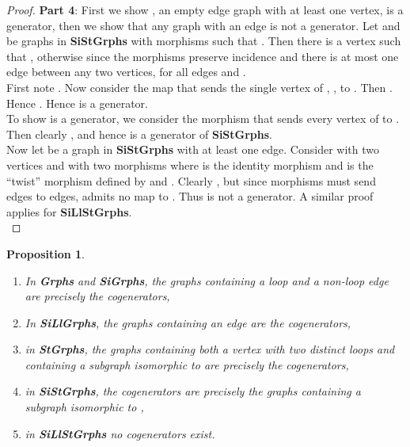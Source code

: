 \documentclass[11pt]{article}
\newtheorem{proposition}[theorem]{Proposition}
\begin{document}
\begin{proof}
\indent \textbf{Part 4}: First we show , an empty edge graph with at least one vertex, is a generator, then we show that any graph with an edge is not a generator. Let  and  be graphs in \textbf{SiStGrphs} with morphisms  such that . Then there is a vertex  such that , otherwise since the morphisms preserve incidence and there is at most one edge between any two vertices,  for all edges  and .\\
\indent First note . Now consider the map  that sends the single vertex of , , to . Then . Hence . Hence  is a generator.\\
\indent To show  is a generator, we consider the morphism  that sends every vertex of  to . Then clearly , and hence  is a generator of \textbf{SiStGrphs}.\\
\indent Now let  be a graph in \textbf{SiStGrphs} with at least one edge. Consider  with two vertices  and  with two morphisms  where  is the identity morphism and  is the ``twist'' morphism defined by  and . Clearly , but since morphisms must send edges to edges,  admits no map to . Thus  is not a generator. A similar proof applies for \textbf{SiLlStGrphs}.\\
\end{proof}
\begin{proposition}
\begin{enumerate}
\item In \textbf{Grphs} and \textbf{SiGrphs}, the graphs containing a loop and a non-loop edge are precisely the cogenerators,
\item In \textbf{SiLlGrphs}, the graphs containing an edge are the cogenerators,
\item in \textbf{StGrphs}, the graphs containing both a vertex with two distinct loops and containing a subgraph isomorphic to  are precisely the cogenerators,
\item in \textbf{SiStGrphs}, the cogenerators are precisely the graphs containing a subgraph isomorphic to ,
\item in \textbf{SiLlStGrphs} no cogenerators exist.
\end{enumerate}
\end{proposition}
\end{document}
